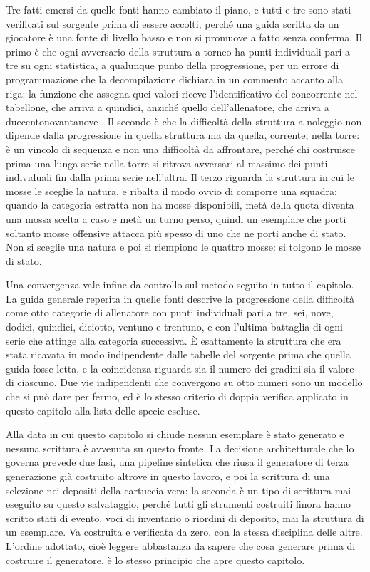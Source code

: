 Tre fatti emersi da quelle fonti hanno cambiato il piano, e tutti e tre sono stati verificati sul sorgente prima di essere accolti, perché una guida scritta da un giocatore è una fonte di livello basso e non si promuove a fatto senza conferma. Il primo è che ogni avversario della struttura a torneo ha punti individuali pari a tre su ogni statistica, a qualunque punto della progressione, per un errore di programmazione che la decompilazione dichiara in un commento accanto alla riga: la funzione che assegna quei valori riceve l'identificativo del concorrente nel tabellone, che arriva a quindici, anziché quello dell'allenatore, che arriva a duecentonovantanove \cite{pokeemerald}. Il secondo è che la difficoltà della struttura a noleggio non dipende dalla progressione in quella struttura ma da quella, corrente, nella torre: è un vincolo di sequenza e non una difficoltà da affrontare, perché chi costruisce prima una lunga serie nella torre si ritrova avversari al massimo dei punti individuali fin dalla prima serie nell'altra. Il terzo riguarda la struttura in cui le mosse le sceglie la natura, e ribalta il modo ovvio di comporre una squadra: quando la categoria estratta non ha mosse disponibili, metà della quota diventa una mossa scelta a caso e metà un turno perso, quindi un esemplare che porti soltanto mosse offensive attacca più spesso di uno che ne porti anche di stato. Non si sceglie una natura e poi si riempiono le quattro mosse: si tolgono le mosse di stato.

Una convergenza vale infine da controllo sul metodo seguito in tutto il capitolo. La guida generale reperita in quelle fonti \cite{pastebin-simboli-oro} descrive la progressione della difficoltà come otto categorie di allenatore con punti individuali pari a tre, sei, nove, dodici, quindici, diciotto, ventuno e trentuno, e con l'ultima battaglia di ogni serie che attinge alla categoria successiva. È esattamente la struttura che era stata ricavata in modo indipendente dalle tabelle del sorgente prima che quella guida fosse letta, e la coincidenza riguarda sia il numero dei gradini sia il valore di ciascuno. Due vie indipendenti che convergono su otto numeri sono un modello che si può dare per fermo, ed è lo stesso criterio di doppia verifica applicato in questo capitolo alla lista delle specie escluse.

Alla data in cui questo capitolo si chiude nessun esemplare è stato generato e nessuna scrittura è avvenuta su questo fronte. La decisione architetturale che lo governa prevede due fasi, una pipeline sintetica che riusa il generatore di terza generazione già costruito altrove in questo lavoro, e poi la scrittura di una selezione nei depositi della cartuccia vera; la seconda è un tipo di scrittura mai eseguito su questo salvataggio, perché tutti gli strumenti costruiti finora hanno scritto stati di evento, voci di inventario o riordini di deposito, mai la struttura di un esemplare. Va costruita e verificata da zero, con la stessa disciplina delle altre. L'ordine adottato, cioè leggere abbastanza da sapere che cosa generare prima di costruire il generatore, è lo stesso principio che apre questo capitolo.

